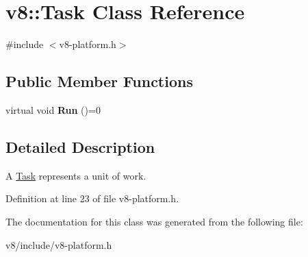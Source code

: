 \hypertarget{classv8_1_1Task}{}\section{v8\+:\+:Task Class Reference}
\label{classv8_1_1Task}


{\ttfamily \#include $<$v8-\/platform.\+h$>$}

\subsection*{Public Member Functions}
\begin{DoxyCompactItemize}
\item 
\mbox{\label{classv8_1_1Task_a6bd5bda0e357fcc2e727bf7b0170f99a}} 
virtual void {\bfseries Run} ()=0
\end{DoxyCompactItemize}


\subsection{Detailed Description}
A \mbox{\hyperlink{classv8_1_1Task}{Task}} represents a unit of work. 

Definition at line 23 of file v8-\/platform.\+h.



The documentation for this class was generated from the following file\+:\begin{DoxyCompactItemize}
\item 
v8/include/v8-\/platform.\+h\end{DoxyCompactItemize}

